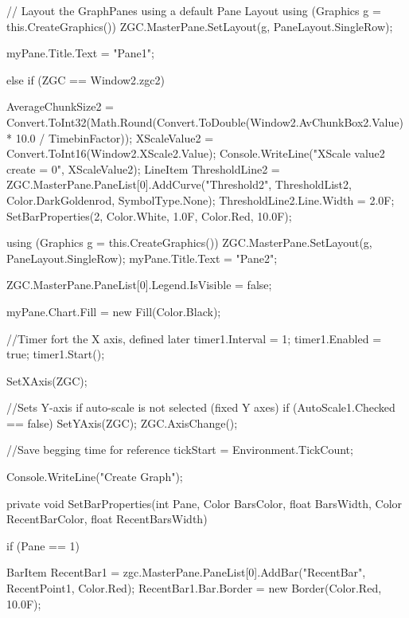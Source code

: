 {{{{                // Layout the GraphPanes using a default Pane Layout
                using (Graphics g = this.CreateGraphics())
                {
                    ZGC.MasterPane.SetLayout(g, PaneLayout.SingleRow);
                }

                myPane.Title.Text = "Pane1";
            }

            else if (ZGC == Window2.zgc2)
            {
                AverageChunkSize2 = Convert.ToInt32(Math.Round(Convert.ToDouble(Window2.AvChunkBox2.Value) * 10.0 / TimebinFactor));
                XScaleValue2 = Convert.ToInt16(Window2.XScale2.Value);
                Console.WriteLine("XScale value2 create = {0}", XScaleValue2);
                LineItem ThresholdLine2 = ZGC.MasterPane.PaneList[0].AddCurve("Threshold2", ThresholdList2, Color.DarkGoldenrod, SymbolType.None);
                ThresholdLine2.Line.Width = 2.0F;
                SetBarProperties(2, Color.White, 1.0F, Color.Red, 10.0F);

                using (Graphics g = this.CreateGraphics())
                {
                    ZGC.MasterPane.SetLayout(g, PaneLayout.SingleRow);
                }
                myPane.Title.Text = "Pane2";
            }


            ZGC.MasterPane.PaneList[0].Legend.IsVisible = false;

            myPane.Chart.Fill = new Fill(Color.Black);

            //Timer fort the X axis, defined later
            timer1.Interval = 1;
            timer1.Enabled = true;
            timer1.Start();

            SetXAxis(ZGC);


            //Sets Y-axis if auto-scale is not selected (fixed Y axes)
            if (AutoScale1.Checked == false)
            {
                SetYAxis(ZGC);
            }
            ZGC.AxisChange();

            //Save begging time for reference
            tickStart = Environment.TickCount;

            Console.WriteLine("Create Graph");

        }



        private void SetBarProperties(int Pane, Color BarsColor, float BarsWidth, Color RecentBarColor, float RecentBarsWidth)
        {
            if (Pane == 1)
            {
                BarItem RecentBar1 = zgc.MasterPane.PaneList[0].AddBar("RecentBar", RecentPoint1, Color.Red);
                RecentBar1.Bar.Border = new Border(Color.Red, 10.0F);

}}}}
